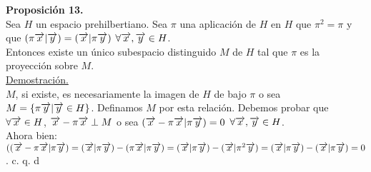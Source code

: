 \textbf{Proposición 13.}\\
Sea $H$ un espacio prehilbertiano. Sea $\pi$ una aplicación de $H$ en $H$ que $\pi^2=\pi$ y que 
$(\pi \overrightarrow{x} | \overrightarrow{y})=( \overrightarrow{x} | \pi \overrightarrow{y})$ $\forall \overrightarrow{x}, \overrightarrow{y} \in H$. \\
Entonces existe un único subespacio distinguido $M$ de $H$ tal que $\pi$ es la proyección sobre $M$.  \\
\underline{Demostración.} \\
$M$, si existe, es necesariamente la imagen de $H$ de bajo $\pi$ o sea $M=\lbrace \pi \overrightarrow{y} | \overrightarrow{y} \in H \rbrace$. Definamos $M$ por esta relación. Debemos probar que $\forall \overrightarrow{x} \in H$, $\overrightarrow{x} - \pi \overrightarrow{x} \perp M$ o sea $(\overrightarrow{x}-\pi \overrightarrow{x} | \pi \overrightarrow{y})=0$ $\forall \overrightarrow{x}, \overrightarrow{y} \in H$.\\
Ahora bien: $((\overrightarrow{x}-\pi \overrightarrow{x} | \pi \overrightarrow{y})=(\overrightarrow{x} | \pi \overrightarrow{y} )- (\pi \overrightarrow{x} | \pi \overrightarrow{y})=(\overrightarrow{x} | \pi \overrightarrow{y}) - (\overrightarrow{x} | \pi^2 \overrightarrow{y} )=(\overrightarrow{x}| \pi \overrightarrow{y})-(\overrightarrow{x} | \pi \overrightarrow{y})=0$.
\phantom{sssssssssssssssssssssssssssssssssss sasdasdasdasdadadssada} c. q. d \\ \\
